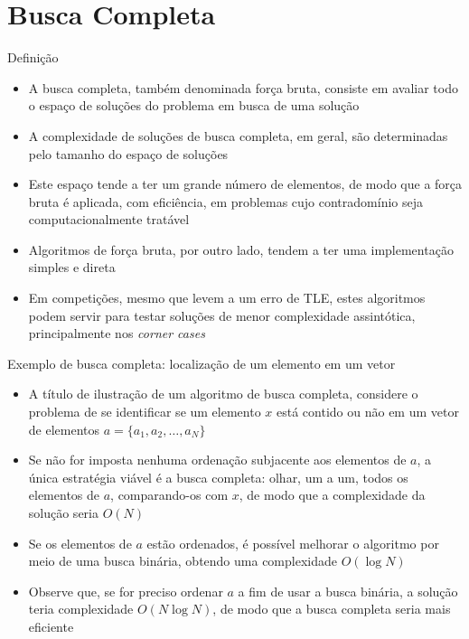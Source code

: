 \section{Busca Completa}

\begin{frame}[fragile]{Definição}

    \begin{itemize}
        \item A busca completa, também denominada força bruta, consiste em avaliar todo o
            espaço de soluções do problema em busca de uma solução

        \item A complexidade de soluções de busca completa, em geral, são determinadas pelo
            tamanho do espaço de soluções

        \item Este espaço tende a ter um grande número de elementos, de modo que a força
            bruta é aplicada, com eficiência, em problemas cujo contradomínio seja 
            computacionalmente tratável

        \item Algoritmos de força bruta, por outro lado, tendem a ter uma implementação simples e
            direta

        \item Em competições, mesmo que levem a um erro de TLE, estes algoritmos podem servir para 
            testar soluções de menor complexidade assintótica, principalmente nos 
            \textit{corner cases}
    \end{itemize}

\end{frame}

\begin{frame}[fragile]{Exemplo de busca completa: localização de um elemento em um vetor}

    \begin{itemize}
        \item A título de ilustração de um algoritmo de busca completa, considere o problema
            de se identificar se um elemento $x$ está contido ou não em um vetor de elementos
            $a = \lbrace a_1, a_2, \ldots, a_N\rbrace$

        \item Se não for imposta nenhuma ordenação subjacente aos elementos de $a$, a única
            estratégia viável é a busca completa: olhar, um a um, todos os elementos de $a$,
            comparando-os com $x$, de modo que a complexidade da solução seria $O(N)$

        \item Se os elementos de $a$ estão ordenados, é possível melhorar o algoritmo por 
            meio de uma busca binária, obtendo uma complexidade $O(\log N)$

        \item Observe que, se for preciso ordenar $a$ a fim de usar a busca binária, a solução teria
            complexidade $O(N\log N)$, de modo que a busca completa seria mais eficiente
    \end{itemize}

\end{frame}

